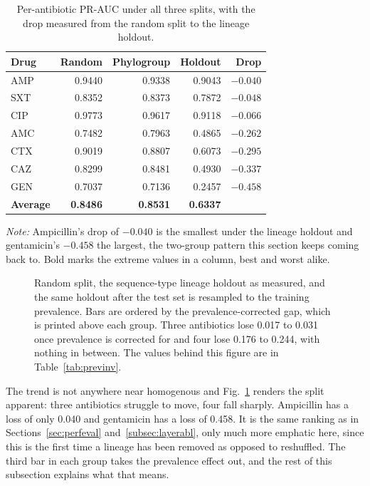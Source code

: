 \documentclass[journal]{IEEEtran}
\begin{document}
\begin{table}[!tb]
\caption{Per-antibiotic PR-AUC under all three splits, with the drop measured from
the random split to the lineage holdout.}
\label{tab:mlst_per_ab}
\centering
\small
\setlength{\tabcolsep}{4pt}
\renewcommand{\arraystretch}{1.05}
\begin{tabular}{|l|r|r|r|r|}
\hline
\rowcolor{headgrey}
\textbf{Drug} & \textbf{Random} & \textbf{Phylogroup} & \textbf{Holdout} & \textbf{Drop} \\ \hline
AMP & 0.9440 & 0.9338 & 0.9043 & $\mathbf{-0.040}$ \\ \hline
SXT & 0.8352 & 0.8373 & 0.7872 & $-0.048$ \\ \hline
CIP & 0.9773 & 0.9617 & 0.9118 & $-0.066$ \\ \hline\hline
AMC & 0.7482 & 0.7963 & 0.4865 & $-0.262$ \\ \hline
CTX & 0.9019 & 0.8807 & 0.6073 & $-0.295$ \\ \hline
CAZ & 0.8299 & 0.8481 & 0.4930 & $-0.337$ \\ \hline
GEN & 0.7037 & 0.7136 & 0.2457 & $\mathbf{-0.458}$ \\ \hline
\rowcolor{oursblue}
\textbf{Average} & \textbf{0.8486} & \textbf{0.8531} & \textbf{0.6337} & \\ \hline
\end{tabular}
\renewcommand{\arraystretch}{1.0}
\vspace{0.4em}

\noindent\footnotesize\textit{Note:} Ampicillin's drop of $-0.040$ is the smallest under the
lineage holdout and gentamicin's $-0.458$ the largest, the two-group pattern this section keeps
coming back to. Bold marks the extreme values in a column, best and worst alike.
\end{table}

\begin{figure}[!tb]
\centering
\resizebox{0.9\textwidth}{!}{}
\caption{Random split, the sequence-type lineage holdout as measured, and the same
holdout after the test set is resampled to the training prevalence. Bars are ordered
by the prevalence-corrected gap, which is printed above each group. Three antibiotics
lose 0.017 to 0.031 once prevalence is corrected for and four lose 0.176 to 0.244,
with nothing in between. The values behind this figure are in
Table~\ref{tab:previnv}.}
\label{fig:lineage_drop}
\end{figure}

The trend is not anywhere near homogenous and Fig.~\ref{fig:lineage_drop} renders
the split apparent: three antibiotics struggle to move, four fall sharply. Ampicillin
has a loss of only 0.040 and gentamicin has a loss of 0.458. It is the same ranking
as in Sections~\ref{sec:perfeval} and~\ref{subsec:layerabl}, only much more emphatic
here, since this is the first time a lineage has been removed as opposed to
reshuffled. The third bar in each group takes the prevalence effect out, and the rest
of this subsection explains what that means.
\end{document}
